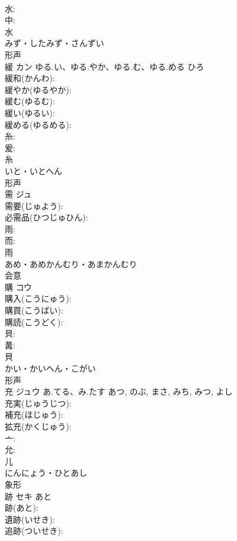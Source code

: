 \documentclass[8pt]{extreport}
\begin{document}
\begin{CJK}{UTF8}{min}
\\	水: 
\\	中: 
\\	水	
\\	みず・したみず・さんずい	
\\	形声 
\\	緩	カン	ゆる.い、ゆる.やか、ゆる.む、ゆる.める	ひろ	
\\	緩和(かんわ): 
\\	緩やか(ゆるやか): 
\\	緩む(ゆるむ): 
\\	緩い(ゆるい): 
\\	緩める(ゆるめる): 
\\	糸: 
\\	爰: 
\\	糸	
\\	いと・いとへん	
\\	形声 
\\	需	ジュ			
\\	需要(じゅよう): 
\\	必需品(ひつじゅひん): 
\\	雨: 
\\	而: 
\\	雨	
\\	あめ・あめかんむり・あまかんむり	
\\	会意 
\\	購	コウ			
\\	購入(こうにゅう): 
\\	購買(こうばい): 
\\	購読(こうどく): 
\\	貝: 
\\	冓: 
\\	貝	
\\	かい・かいへん・こがい	
\\	形声 
\\	充	ジュウ	あ.てる、み.たす	あつ, のぶ, まさ, みち, みつ, よし	
\\	充実(じゅうじつ): 
\\	補充(ほじゅう): 
\\	拡充(かくじゅう): 
\\	亠: 
\\	允: 
\\	儿	
\\	にんにょう・ひとあし	
\\	象形 
\\	跡	セキ	あと		
\\	跡(あと): 
\\	遺跡(いせき): 
\\	追跡(ついせき): 

\end{CJK}
\end{document}
